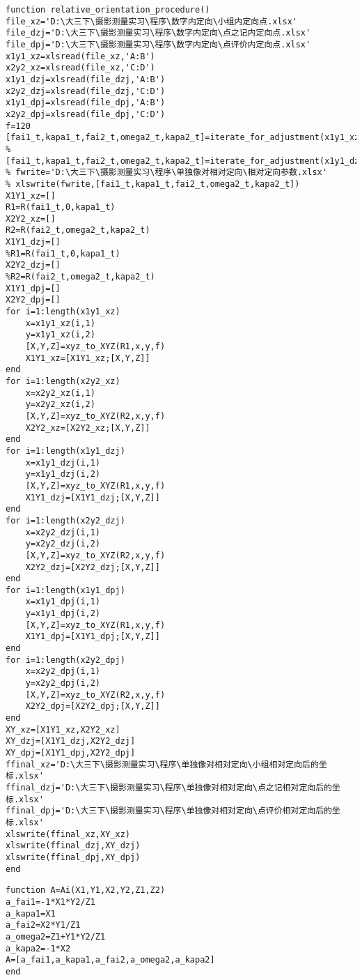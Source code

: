 \begin{lstlisting}[caption=relative\_orientation\_procedure.m]
function relative_orientation_procedure()
file_xz='D:\大三下\摄影测量实习\程序\数字内定向\小组内定向点.xlsx'
file_dzj='D:\大三下\摄影测量实习\程序\数字内定向\点之记内定向点.xlsx'
file_dpj='D:\大三下\摄影测量实习\程序\数字内定向\点评价内定向点.xlsx'
x1y1_xz=xlsread(file_xz,'A:B')
x2y2_xz=xlsread(file_xz,'C:D')
x1y1_dzj=xlsread(file_dzj,'A:B')
x2y2_dzj=xlsread(file_dzj,'C:D')
x1y1_dpj=xlsread(file_dpj,'A:B')
x2y2_dpj=xlsread(file_dpj,'C:D')
f=120
[fai1_t,kapa1_t,fai2_t,omega2_t,kapa2_t]=iterate_for_adjustment(x1y1_xz,x2y2_xz,f)
%[fai1_t,kapa1_t,fai2_t,omega2_t,kapa2_t]=iterate_for_adjustment(x1y1_dzj,x2y2_dzj,f)
% fwrite='D:\大三下\摄影测量实习\程序\单独像对相对定向\相对定向参数.xlsx'
% xlswrite(fwrite,[fai1_t,kapa1_t,fai2_t,omega2_t,kapa2_t])
X1Y1_xz=[]
R1=R(fai1_t,0,kapa1_t)
X2Y2_xz=[]
R2=R(fai2_t,omega2_t,kapa2_t)
X1Y1_dzj=[]
%R1=R(fai1_t,0,kapa1_t) 
X2Y2_dzj=[]
%R2=R(fai2_t,omega2_t,kapa2_t)
X1Y1_dpj=[]
X2Y2_dpj=[]
for i=1:length(x1y1_xz)
    x=x1y1_xz(i,1)
    y=x1y1_xz(i,2)
    [X,Y,Z]=xyz_to_XYZ(R1,x,y,f)
    X1Y1_xz=[X1Y1_xz;[X,Y,Z]]
end
for i=1:length(x2y2_xz)
    x=x2y2_xz(i,1)
    y=x2y2_xz(i,2)
    [X,Y,Z]=xyz_to_XYZ(R2,x,y,f)
    X2Y2_xz=[X2Y2_xz;[X,Y,Z]]
end    
for i=1:length(x1y1_dzj)
    x=x1y1_dzj(i,1)
    y=x1y1_dzj(i,2)
    [X,Y,Z]=xyz_to_XYZ(R1,x,y,f)
    X1Y1_dzj=[X1Y1_dzj;[X,Y,Z]]
end
for i=1:length(x2y2_dzj)
    x=x2y2_dzj(i,1)
    y=x2y2_dzj(i,2)
    [X,Y,Z]=xyz_to_XYZ(R2,x,y,f)
    X2Y2_dzj=[X2Y2_dzj;[X,Y,Z]]
end    
for i=1:length(x1y1_dpj)
    x=x1y1_dpj(i,1)
    y=x1y1_dpj(i,2)
    [X,Y,Z]=xyz_to_XYZ(R1,x,y,f)
    X1Y1_dpj=[X1Y1_dpj;[X,Y,Z]]
end
for i=1:length(x2y2_dpj)
    x=x2y2_dpj(i,1)
    y=x2y2_dpj(i,2)
    [X,Y,Z]=xyz_to_XYZ(R2,x,y,f)
    X2Y2_dpj=[X2Y2_dpj;[X,Y,Z]]
end    
XY_xz=[X1Y1_xz,X2Y2_xz]
XY_dzj=[X1Y1_dzj,X2Y2_dzj]
XY_dpj=[X1Y1_dpj,X2Y2_dpj]
ffinal_xz='D:\大三下\摄影测量实习\程序\单独像对相对定向\小组相对定向后的坐标.xlsx'
ffinal_dzj='D:\大三下\摄影测量实习\程序\单独像对相对定向\点之记相对定向后的坐标.xlsx'
ffinal_dpj='D:\大三下\摄影测量实习\程序\单独像对相对定向\点评价相对定向后的坐标.xlsx'
xlswrite(ffinal_xz,XY_xz)
xlswrite(ffinal_dzj,XY_dzj)
xlswrite(ffinal_dpj,XY_dpj)
end
\end{lstlisting}

\begin{lstlisting}[caption=Ai.m]
function A=Ai(X1,Y1,X2,Y2,Z1,Z2)
a_fai1=-1*X1*Y2/Z1
a_kapa1=X1
a_fai2=X2*Y1/Z1
a_omega2=Z1+Y1*Y2/Z1
a_kapa2=-1*X2
A=[a_fai1,a_kapa1,a_fai2,a_omega2,a_kapa2]
end
\end{lstlisting}

